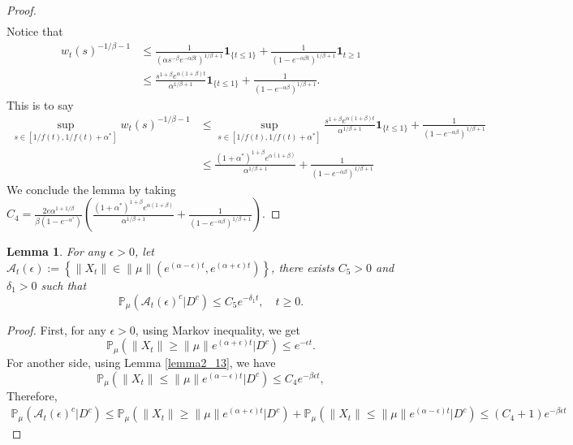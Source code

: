 \documentclass[12pt, a4paper]{amsart}
\newtheorem{lem}[thm]{Lemma}
\theoremstyle{definition}
\numberwithin{equation}{section}
\begin{document}
\begin{proof}
\begin{align*}
\end{align*}
Notice that
\begin{align*}
    w_t(s)^{-1/\beta-1}&\leq \frac{1}{(\alpha s^{-\beta}e^{-\alpha \beta t})^{1/
    \beta+1}}\mathbf{1}_{\{t\leq 1\}}+\frac{1}{(1-e^{-\alpha\beta t})^{1/\beta+1}}\mathbf{1}_{t\geq 1}\\
    &\leq \frac{s^{1+\beta}e^{\alpha(1+\beta)t}}{\alpha^{1/\beta +1}}\mathbf{1}_{\{t\leq 1\}}+\frac{1}{(1-e^{-\alpha\beta })^{1/\beta+1}}.
\end{align*}
This is to say
\begin{align*}
    \sup_{s\in [1/f(t),1/f(t)+\alpha^*]}w_t(s)^{-1/\beta-1}&\leq\sup_{s\in [1/f(t),1/f(t)+\alpha^*]}\frac{s^{1+\beta}e^{\alpha(1+\beta)t}}{\alpha^{1/\beta +1}}\mathbf{1}_{\{t\leq 1\}}+\frac{1}{(1-e^{-\alpha\beta })^{1/\beta+1}}\\
    &\leq \frac{(1+\alpha^*)^{1+\beta}e^{\alpha(1+\beta)}}{\alpha^{1/\beta+1}}+\frac{1}{(1-e^{-\alpha\beta })^{1/\beta+1}}
\end{align*}
We conclude the lemma by taking $C_4= \frac{2 e \alpha^{1+1/\beta}}{\beta (1-e^{-\alpha^*})}\left(\frac{(1+\alpha^*)^{1+\beta}e^{\alpha(1+\beta)}}{\alpha^{1/\beta+1}}+\frac{1}{(1-e^{-\alpha\beta })^{1/\beta+1}}\right)$.
\end{proof}
\begin{lem}\label{lemma28}
  For any $\epsilon>0$, let $\mathcal{A}_t(\epsilon):=\left\{ \|X_t\|\in \|\mu\|\left(e^{(\alpha-\epsilon)t},e^{(\alpha+\epsilon)t}\right)\right\}$, there exists $C_5>0$ and $\delta_1>0$ such that
  $$\mathbb{P}_{\mu}\left(\mathcal{A}_t(\epsilon)^c|D^c\right)\leq C_5 e^{-\delta_1 t},\quad t\geq 0.$$
\end{lem}

\begin{proof}
    First, for any $\epsilon>0$, using Markov inequality, we get
    $$\mathbb{P}_{\mu}(\|X_t\|\geq\|\mu\|e^{(\alpha+\epsilon)t}|D^c)\leq e^{-\epsilon t}.$$
    For another side, using Lemma \ref{lemma2_13}, we have
    $$\mathbb{P}_{\mu}\left(\|X_t\|\leq \|\mu\|e^{(\alpha-\epsilon)t}|D^c\right)\leq C_4 e^{-\beta\epsilon t}, $$
Therefore,
\begin{align*}
    \mathbb{P}_{\mu}\left(\mathcal{A}_t(\epsilon)^c|D^c\right)\leq \mathbb{P}_{\mu}(\|X_t\|\geq\|\mu\|e^{(\alpha+\epsilon)t}|D^c)+\mathbb{P}_{\mu}\left(\|X_t\|\leq \|\mu\|e^{(\alpha-\epsilon)t}|D^c\right)\leq(C_4+1)e^{-\beta \epsilon t }
\end{align*}
\end{proof}
\end{document}

